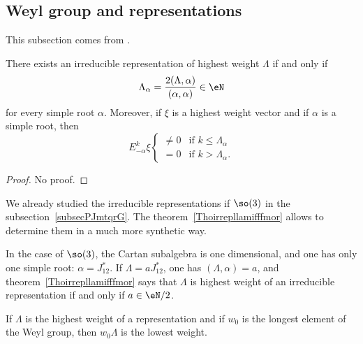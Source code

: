 \subsection{Weyl group and representations}

This subsection comes from \cite{Cornwell}.

\begin{theorem}     \label{Thoirrepllamifffmor}
    There exists an irreducible representation of highest weight $\Lambda$ if and only if
    \begin{equation}
        \Lambda_{\alpha}=\frac{ 2(\Lambda,\alpha) }{ (\alpha,\alpha) }\in\eN
    \end{equation}
    for every simple root $\alpha$. Moreover, if $\xi$ is a highest weight vector and if $\alpha$ is a simple root, then
    \begin{equation}
        E_{-\alpha}^k\xi
                \begin{cases}
                    \neq 0  &\text{if }k\leq\Lambda_{\alpha}\\
                    =0  &\text{if }k>\Lambda_{\alpha}.
                \end{cases}
    \end{equation}
\end{theorem}

\begin{proof}
    No proof.
\end{proof}

\begin{example} \label{ExHESKimc}
    We already studied the irreducible representations if \( \so(3)\) in the subsection~\ref{subsecPJmtqrG}. The theorem~\ref{Thoirrepllamifffmor} allows to determine them in a much more synthetic way.

    In the case of $\so(3)$, the Cartan subalgebra is one dimensional, and one has only one simple root: $\alpha=J_{12}^*$. If $\Lambda=aJ_{12}^*$, one has $(\Lambda,\alpha)=a$, and theorem~\ref{Thoirrepllamifffmor} says that $\Lambda$ is highest weight of an irreducible representation if and only if $a\in \eN/2$.
\end{example}

\begin{theorem}     \label{ThoLOngestlowestrepres}
    If \( \Lambda\) is the highest weight of a representation and if \( w_0\) is the longest element of the Weyl group, then \( w_0\Lambda\) is the lowest weight.
\end{theorem}

